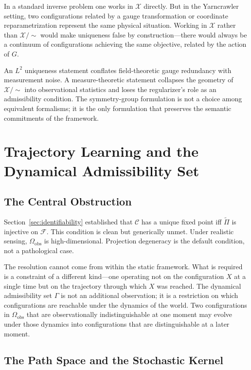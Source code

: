 \documentclass[12pt, oneside]{article}
\newcommand{\Xmod}{\mathcal{X}/{\sim}}
\newcommand{\Ftil}{\widetilde{\Pi}}
\begin{document}
In a standard inverse problem one works in $\mathcal{X}$ directly. But in the Yarncrawler
setting, two configurations related by a gauge transformation or coordinate
reparametrization represent the same physical situation. Working in $\mathcal{X}$ rather
than $\Xmod$ would make uniqueness false by construction---there would always be a
continuum of configurations achieving the same objective, related by the action of $G$.

An $L^2$ uniqueness statement conflates field-theoretic gauge redundancy with measurement
noise. A measure-theoretic statement collapses the geometry of $\Xmod$ into observational
statistics and loses the regularizer's role as an admissibility condition. The
symmetry-group formulation is not a choice among equivalent formalisms; it is the only
formulation that preserves the semantic commitments of the framework.

\section{Trajectory Learning and the Dynamical Admissibility Set}
\label{sec:disambiguation}

\subsection{The Central Obstruction}

Section~\ref{sec:identifiability} established that $\mathcal{C}$ has a unique fixed point
iff $\Ftil$ is injective on $\mathcal{F}$. This condition is clean but generically unmet.
Under realistic sensing, $\Omega_{\mathrm{obs}}$ is high-dimensional. Projection degeneracy
is the default condition, not a pathological case.

The resolution cannot come from within the static framework. What is required is a
constraint of a different kind---one operating not on the configuration $X$ at a single
time but on the trajectory through which $X$ was reached. The dynamical admissibility set
$\Gamma$ is not an additional observation; it is a restriction on which configurations are
reachable under the dynamics of the world. Two configurations in $\Omega_{\mathrm{obs}}$
that are observationally indistinguishable at one moment may evolve under those dynamics
into configurations that are distinguishable at a later moment.

\subsection{The Path Space and the Stochastic Kernel}
\end{document}
